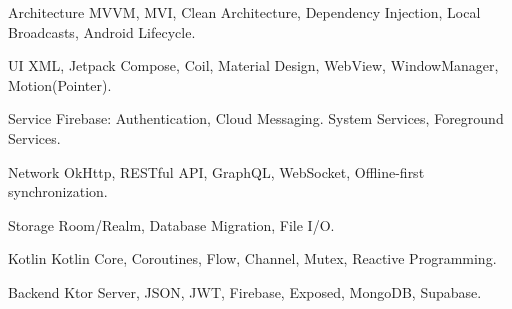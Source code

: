 \begin{cvskills}

    \cvskill
    {Architecture}
    {MVVM, MVI, Clean Architecture, Dependency Injection, Local Broadcasts, Android Lifecycle.}

    \cvskill
    {UI}
    {XML, Jetpack Compose, Coil, Material Design, WebView, WindowManager, Motion(Pointer).}

    \cvskill
    {Service}
    {Firebase: Authentication, Cloud Messaging. System Services, Foreground Services.}

    \cvskill
    {Network}
    {OkHttp, RESTful API, GraphQL, WebSocket, Offline-first synchronization.}

    \cvskill
    {Storage}
    {Room/Realm, Database Migration, File I/O.}

    \cvskill
    {Kotlin}
    {Kotlin Core, Coroutines, Flow, Channel, Mutex, Reactive Programming.}

    \cvskill
    {Backend}
    {Ktor Server, JSON, JWT, Firebase, Exposed, MongoDB, Supabase.}

\end{cvskills}
